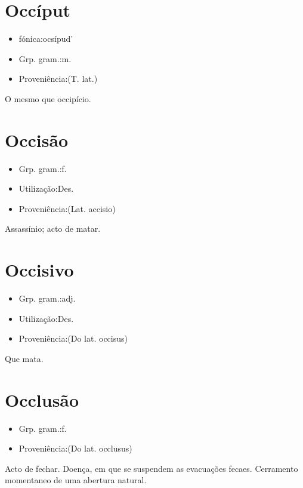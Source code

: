 \section{Occíput}
\begin{itemize}
\item {fónica:ocsípud'}
\end{itemize}
\begin{itemize}
\item {Grp. gram.:m.}
\end{itemize}
\begin{itemize}
\item {Proveniência:(T. lat.)}
\end{itemize}
O mesmo que \textunderscore occipício\textunderscore .
\section{Occisão}
\begin{itemize}
\item {Grp. gram.:f.}
\end{itemize}
\begin{itemize}
\item {Utilização:Des.}
\end{itemize}
\begin{itemize}
\item {Proveniência:(Lat. \textunderscore accisio\textunderscore )}
\end{itemize}
Assassínio; acto de matar.
\section{Occisivo}
\begin{itemize}
\item {Grp. gram.:adj.}
\end{itemize}
\begin{itemize}
\item {Utilização:Des.}
\end{itemize}
\begin{itemize}
\item {Proveniência:(Do lat. \textunderscore occisus\textunderscore )}
\end{itemize}
Que mata.
\section{Occlusão}
\begin{itemize}
\item {Grp. gram.:f.}
\end{itemize}
\begin{itemize}
\item {Proveniência:(Do lat. \textunderscore occlusus\textunderscore )}
\end{itemize}
Acto de fechar.
Doença, em que se suspendem as evacuações fecaes.
Cerramento momentaneo de uma abertura natural.
